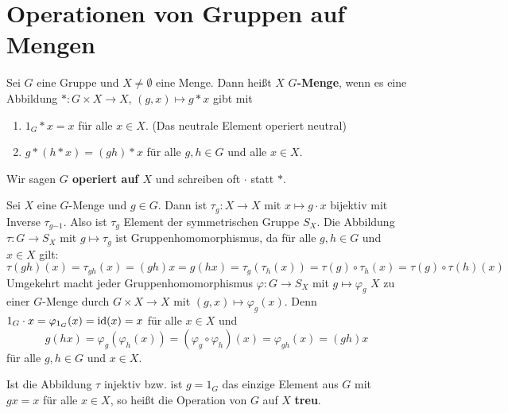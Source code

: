 \section{Operationen von Gruppen auf Mengen}
\begin{definition}
	Sei $G$ eine Gruppe und $X \neq \emptyset$ eine Menge. Dann heißt $X$ \textbf{$G$-Menge}, wenn es eine Abbildung $* \colon G \times X \to X$, $(g,x) \mapsto g*x$ gibt mit 
		\begin{enumerate}[label={\bfseries(O\arabic*)}]
		\item $1_G * x = x$ für alle $x \in X$. (Das neutrale Element operiert neutral)
		\item $g * (h * x) = (gh)*x$ für alle $g, h \in G$ und alle $x \in X$.
	\end{enumerate} 
	Wir sagen \textbf{$G$ operiert auf $X$} und schreiben oft $\cdot$ statt $*$.
\end{definition}
\begin{rem}\label{rem3_2}
	Sei $X$ eine $G$-Menge und $g \in G$. Dann ist $\tau_g \colon X \to X$ mit $x \mapsto g\cdot x$ bijektiv mit Inverse $\tau_{g{-1}}$. Also ist $\tau_g$ Element der symmetrischen Gruppe $S_X$. Die Abbildung $\tau \colon G \to S_X$ mit $g \mapsto \tau_g$ ist Gruppenhomomorphismus, da für alle $g, h \in G$ und $x \in X$ gilt:
	\[\tau(gh)(x) = \tau_{gh}(x) = (gh) x = g(hx) = \tau_g(\tau_h(x)) = \tau(g) \circ \tau_h(x) = \tau(g) \circ \tau(h)(x)\]
	Umgekehrt macht jeder Gruppenhomomorphismus $\varphi \colon G \to S_X$ mit $g \mapsto \varphi_g$ $X$ zu einer $G$-Menge durch $G \times X \to X$ mit $(g,x) \mapsto \varphi_g(x)$. Denn $1_G \cdot x = \varphi_{1_G}(x) = \mathrm{id}(x) = x$ für alle $x \in X$ und 
	\[g(hx) = \varphi_g(\varphi_h(x)) = (\varphi_g \circ \varphi_h)(x) = \varphi_{gh}(x) = (gh)x\]
	für alle $g,h \in G$ und $x \in X$.
\end{rem}

Ist die Abbildung $\tau$ injektiv bzw. ist $g = 1_G$ das einzige Element aus $G$ mit $gx = x$ für alle $x \in X$, so heißt die Operation von $G$ auf $X$ \textbf{treu}.

